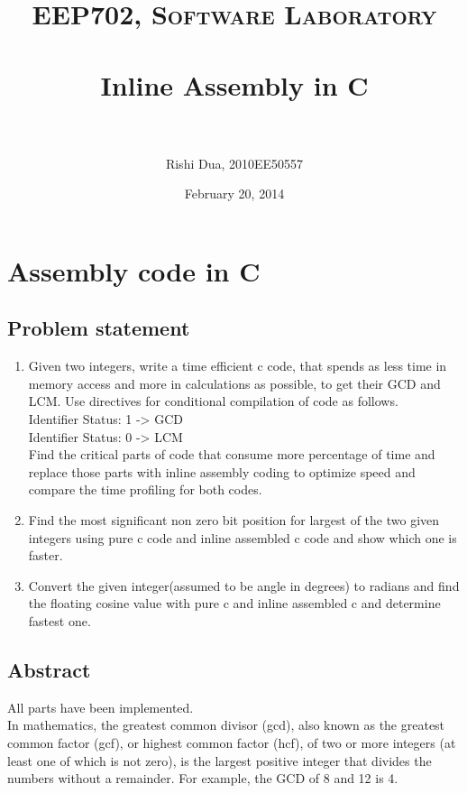 \documentclass[paper=a4, fontsize=11pt]{scrartcl} %
\title{	
\normalfont \normalsize 
\textsc{EEP702, Software Laboratory} \\ [25pt] %
\horrule{0.5pt} \\[0.4cm] %
\huge Inline Assembly in C\\ %
\horrule{2pt} \\[0.5cm] %
}
\author{Rishi Dua, 2010EE50557} %
\date{\normalsize February 20, 2014} %
\numberwithin{equation}{section} %
\numberwithin{figure}{section} %
\numberwithin{table}{section} %
\begin{document}
\maketitle %


\section{Assembly code in C}


\subsection{Problem statement}
\begin {enumerate}
\item Given two integers, write a time efficient c code, that spends as less time in memory access and more in calculations as possible, to get their GCD and LCM. Use directives for conditional compilation of code as follows.\\
Identifier Status: 1 -> GCD\\
Identifier Status: 0 -> LCM\\
Find the critical parts of code that consume more percentage of time and replace those parts with inline assembly coding to optimize speed and compare the time profiling for both codes.\\
\item Find the most significant non zero bit position for largest of the two given integers using pure c code and inline assembled c code and show which one is faster.
\item Convert the given integer(assumed to be angle in degrees) to radians and find the floating cosine value with pure c and inline assembled c and determine fastest one.

\end{enumerate}
\subsection{Abstract}

All parts have been implemented.\\

In mathematics, the greatest common divisor (gcd), also known as the greatest common factor (gcf), or highest common factor (hcf), of two or more integers (at least one of which is not zero), is the largest positive integer that divides the numbers without a remainder. For example, the GCD of 8 and 12 is 4.\\
\end{document}
